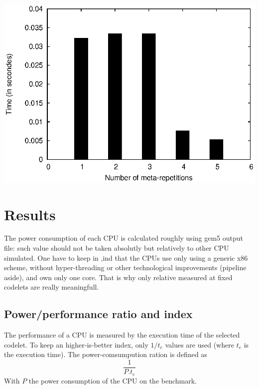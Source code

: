 \documentclass{article}
\newenvironment{Figure}
  {\par\medskip\noindent\center\minipage{0.9\linewidth}}
  {\endminipage\par\bigskip\medskip}
\begin{document}
\begin{multicols}{2}
\begin{Figure}
\centering
\includegraphics[width=\linewidth]{nogood.eps}
\end{Figure}

\section{Results}
\label{results}
The power consumption of each CPU is calculated roughly using gem5 output file: such value should not be taken absolutly but relatively to other CPU simulated. One have to keep in ,ind that the CPUs use only using a generic x86 scheme, without hyper-threading or other technological improvements (pipeline aside), and own only one core. That is why only relative measured at fixed codelets are really meaningfull.

\subsection{Power/performance ratio and index}
The performance of a CPU is measured by the execution time of the selected codelet. To keep an higher-is-better index, only $1/t_e$ values are used (where $t_e$ is the execution time).
The power-comsumpution ration is defined as 
\begin{equation}
\frac{1}{P.t_e}
\end{equation}
With $P$ the power consumption of the CPU on the benchmark.


\end{multicols}
\end{document}
